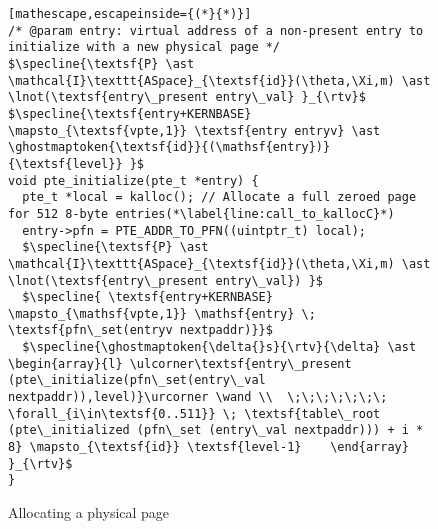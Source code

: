 \begin{figure}\footnotesize
  \begin{lstlisting}[mathescape,escapeinside={(*}{*)}]
/* @param entry: virtual address of a non-present entry to initialize with a new physical page */
$\specline{\textsf{P} \ast \mathcal{I}\texttt{ASpace}_{\textsf{id}}(\theta,\Xi,m) \ast \lnot(\textsf{entry\_present entry\_val} }_{\rtv}$
$\specline{\textsf{entry+KERNBASE} \mapsto_{\textsf{vpte,1}} \textsf{entry entryv} \ast \ghostmaptoken{\textsf{id}}{(\mathsf{entry})}{\textsf{level}} }$
void pte_initialize(pte_t *entry) {
  pte_t *local = kalloc(); // Allocate a full zeroed page for 512 8-byte entries(*\label{line:call_to_kallocC}*)
  entry->pfn = PTE_ADDR_TO_PFN((uintptr_t) local);
  $\specline{\textsf{P} \ast \mathcal{I}\texttt{ASpace}_{\textsf{id}}(\theta,\Xi,m) \ast \lnot(\textsf{entry\_present entry\_val}) }$
  $\specline{ \textsf{entry+KERNBASE} \mapsto_{\mathsf{vpte,1}} \mathsf{entry} \; \textsf{pfn\_set(entryv nextpaddr)}}$
  $\specline{\ghostmaptoken{\delta{}s}{\rtv}{\delta} \ast \begin{array}{l} \ulcorner\textsf{entry\_present (pte\_initialize(pfn\_set(entry\_val nextpaddr)),level)}\urcorner \wand \\  \;\;\;\;\;\;\; \forall_{i\in\textsf{0..511}} \; \textsf{table\_root (pte\_initialized (pfn\_set (entry\_val nextpaddr))) + i * 8} \mapsto_{\textsf{id}} \textsf{level-1}    \end{array}  }_{\rtv}$
}
\end{lstlisting}
\vspace{-1em}
\caption{Allocating a physical page }
\label{pteinitializespecC}
\vspace{-1em}
\end{figure}

